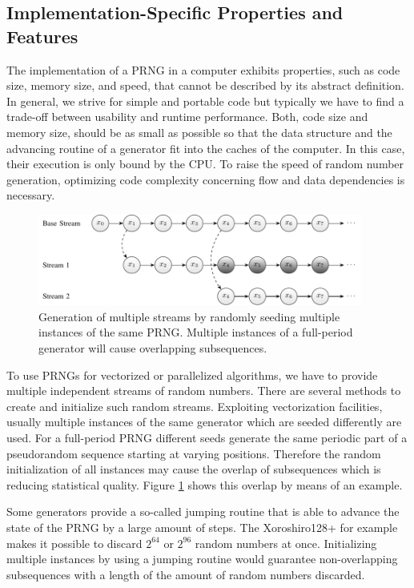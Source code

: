 \documentclass{stdlocal}
\begin{document}
  \subsection{Implementation-Specific Properties and Features}
  The implementation of a PRNG in a computer exhibits properties, such as code size, memory size, and speed, that cannot be described by its abstract definition.
  In general, we strive for simple and portable code but typically we have to find a trade-off between usability and runtime performance.
  Both, code size and memory size, should be as small as possible so that the data structure and the advancing routine of a generator fit into the caches of the computer.
  In this case, their execution is only bound by the CPU.
  To raise the speed of random number generation, optimizing code complexity concerning flow and data dependencies is necessary.

  \begin{figure}
    \center
    \includegraphics[width=0.95\textwidth]{figures/seeding_multiple_streams.pdf}
    \caption[Seeding Generation of Multiple Streams]{
      Generation of multiple streams by randomly seeding multiple instances of the same PRNG.
      Multiple instances of a full-period generator will cause overlapping subsequences.
    }
    \label{fig:seeding-multiple-streams}
  \end{figure}

  To use PRNGs for vectorized or parallelized algorithms, we have to provide multiple independent streams of random numbers.
  There are several methods to create and initialize such random streams.
  Exploiting vectorization facilities, usually multiple instances of the same generator which are seeded differently are used.
  For a full-period PRNG different seeds generate the same periodic part of a pseudorandom sequence starting at varying positions.
  Therefore the random initialization of all instances may cause the overlap of subsequences which is reducing statistical quality.
  Figure \ref{fig:seeding-multiple-streams} shows this overlap by means of an example.
  \autocite{fog2015,lecuyer2017}

  Some generators provide a so-called jumping routine that is able to advance the state of the PRNG by a large amount of steps.
  The Xoroshiro128+ for example makes it possible to discard $2^{64}$ or $2^{96}$ random numbers at once.
  Initializing multiple instances by using a jumping routine would guarantee non-overlapping subsequences with a length of the amount of random numbers discarded.
  \autocite{fog2015,lecuyer2017}
\end{document}
